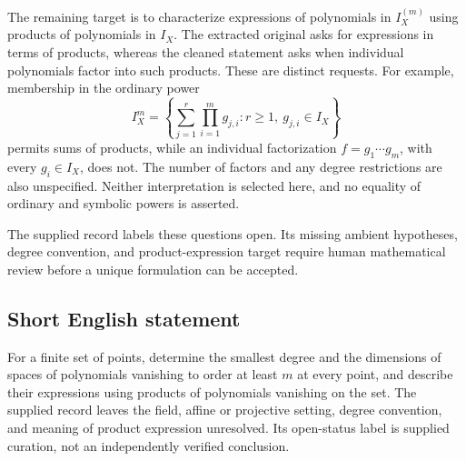 \documentclass[11pt]{article}
\begin{document}
The remaining target is to characterize expressions of polynomials in \(I_X^{(m)}\) using products of polynomials in \(I_X\). The extracted original asks for expressions in terms of products, whereas the cleaned statement asks when individual polynomials factor into such products. These are distinct requests. For example, membership in the ordinary power
\[
I_X^m=\left\{\sum_{j=1}^{r}\prod_{i=1}^{m}g_{j,i}:r\geq1,\ g_{j,i}\in I_X\right\}
\]
permits sums of products, while an individual factorization \(f=g_1\cdots g_m\), with every \(g_i\in I_X\), does not. The number of factors and any degree restrictions are also unspecified. Neither interpretation is selected here, and no equality of ordinary and symbolic powers is asserted.

The supplied record labels these questions open. Its missing ambient hypotheses, degree convention, and product-expression target require human mathematical review before a unique formulation can be accepted.
\subsection{Short English statement}
For a finite set of points, determine the smallest degree and the dimensions of spaces of polynomials vanishing to order at least \(m\) at every point, and describe their expressions using products of polynomials vanishing on the set. The supplied record leaves the field, affine or projective setting, degree convention, and meaning of product expression unresolved. Its open-status label is supplied curation, not an independently verified conclusion.
\end{document}
